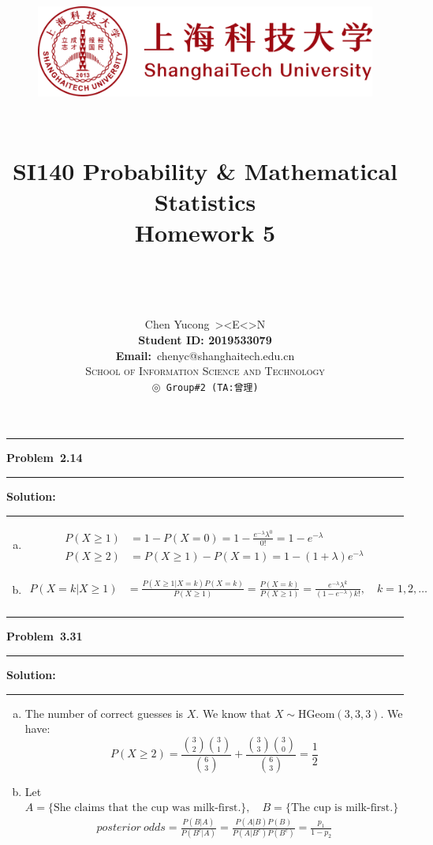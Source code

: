 \documentclass[10.5pt]{article}
\title{
	\normalfont \normalsize
	\begin{figure}[!h]
	\centering
	\includegraphics[width=4.8in, keepaspectratio]{logo_red.pdf}\\[1cm]
	\end{figure}
	\horrule{0.5pt} \\[0.4cm]
	\Huge SI140 Probability \& Mathematical Statistics\\[0.4cm]
	\LARGE Homework 5\\
	\horrule{2pt} \\[1.5cm]
}
\author{\Song{\huge\textbf{陈昱聪}}\\[0.2cm]Chen Yucong\ ><E<>N\\[4.5cm]\textbf{Student ID: 2019533079}\\[0.2cm] 
\textbf{Email:}\ {\ttfamily chenyc@shanghaitech.edu.cn}\\[0.8cm] \LARGE\textsc{School of Information Science and Technology}\\[0.63cm]
\texttt{$\circledcirc$ Group\#2\ (TA:曾理)}}
\date{}
\newcommand\question[1]{\vspace{.2in}\hrule\vspace{0.04in}\textbf{Problem\ #1}\vspace{.4em}\hrule\vspace{.10in}}
\newcommand\Solution{\vspace{.3in}\textbf{Solution:}\vspace{.5em}\hrule\vspace{.08in}\par}
\begin{document}
	
\maketitle
\thispagestyle{firstpage}
\thispagestyle{empty}
\setcounter{page}{0}

\pagebreak

\question{2.14}
	\Solution{}
	\begin{enumerate}[(a)]
		\item \begin{align*}
			P(X\geqslant1) &= 1 - P(X = 0) = 1 - \frac{e^{-\lambda}\lambda^0}{0!} = 1 - e^{-\lambda}\\[6pt]
			P(X\geqslant2) &= P(X\geqslant1) - P(X = 1)= 1 - (1+\lambda)e^{-\lambda}
		\end{align*}
		\item \begin{align*}
			P(X=k|X\geqslant1) &= \frac{P(X\geqslant1|X=k)P(X=k)}{P(X\geqslant1)}=\frac{P(X=k)}{P(X\geqslant1)} = \frac{e^{-\lambda}\lambda^k}{(1-e^{-\lambda})k!},\quad k = 1, 2, \dots\\[6pt]
		\end{align*}
	\end{enumerate}
   

\vspace{3cm}

\question{3.31}
	\Solution{}
	\begin{enumerate}[(a)]
		\item The number of correct guesses is $X$. We know that $X\sim \text{HGeom}(3, 3, 3)$.
		We have:
			$$P(X \geqslant 2) = \frac{\binom{3}{2}\binom{3}{1}}{\binom{6}{3}}+\frac{\binom{3}{3}\binom{3}{0}}{\binom{6}{3}} = \frac{1}{2}$$
		\item Let $A = \{\text{She claims that the cup was milk-first.}\},\quad B = \{\text{The cup is milk-first.}\}$
		\begin{align*}
			posterior\ odds 
			= \frac{P(B|A)}{P(B^c|A)}
			= \frac{P(A|B)P(B)}{P(A|B^c)P(B^c)}
			= \frac{p_1}{1-p_2}
		\end{align*}
	\end{enumerate}

\pagebreak
\end{document}
